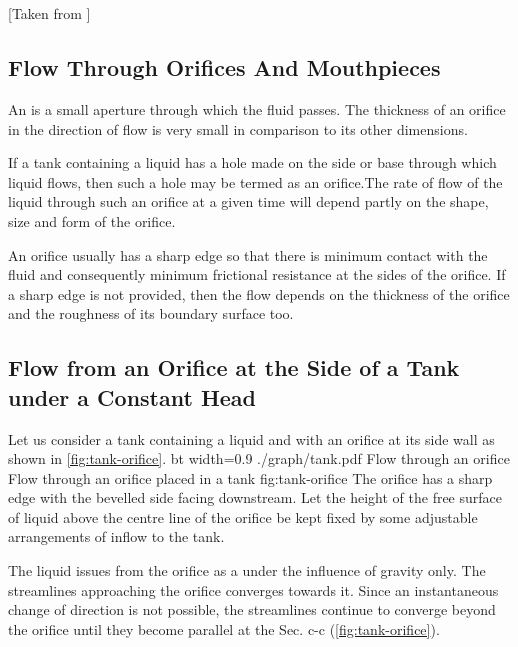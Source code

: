 \chapter*{\docTitle}
%
[Taken from \cite{nptel:2015}]


\section*{Flow Through Orifices And Mouthpieces}
%
An  is a small aperture through which the fluid passes. The thickness of an orifice in the direction of flow is very small in comparison to its other dimensions.

If a tank containing a liquid has a hole made on the side or base through which liquid flows, then such a hole may be termed as an orifice.The rate of flow of the liquid through such an orifice at a given time will depend partly on the shape, size and form of the orifice. 

An orifice usually has a sharp edge so that there is minimum contact with the fluid and consequently minimum frictional resistance at the sides of the orifice. If a sharp edge is not provided, then the flow depends on the thickness of the orifice and the roughness of its boundary surface too.


\section*{Flow from an Orifice at the Side of a Tank under a Constant Head}
%
Let us consider a tank containing a liquid and with an orifice at its side wall as shown in \cref{fig:tank-orifice}.
%
%
\docfigure
  {bt}
  {width=0.9\textwidth}
  {./graph/tank.pdf}
  {Flow through an orifice}
  {Flow through an orifice placed in a tank \cite{nptel:2015}}
  {fig:tank-orifice}
%
%
The orifice has a sharp edge with the bevelled side facing downstream. Let the height of the free surface of liquid above the centre line of the orifice be kept fixed by some adjustable arrangements of inﬂow to the tank. 

The liquid issues from the orifice as a  under the influence of gravity only. The streamlines approaching the orifice converges towards it. Since an instantaneous change of direction is not possible, the streamlines continue to converge beyond the orifice until they become parallel at the Sec. c-c (\cref{fig:tank-orifice}). 

